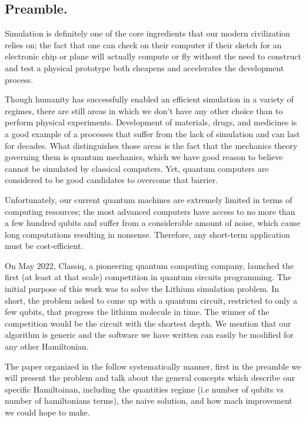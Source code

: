 \documentclass{article}
\begin{document}
\begin{multicols*}{2}

\section{Preamble.}
Simulation is definitely one of the core ingredients that our modern civilization relies on; the fact that one can check on their computer if their sketch for an electronic chip or plane will actually compute or fly without the need to construct and test a physical prototype both cheapens and accelerates the development process. 

Though humanity has successfully enabled an efficient simulation in a variety of regimes, there are still areas in which we don't have any other choice than to perform physical experiments. Development of materials, drugs, and medicines is a good example of a processes that suffer from the lack of simulation and can last for decades. What distinguishes those areas is the fact that the mechanics theory governing them is quantum mechanics, which we have good reason to believe cannot be simulated by classical computers. Yet, quantum computers are considered to be good candidates to overcome that barrier. 

Unfortunately, our current quantum machines are extremely limited in terms of computing resources; the most advanced computers have access to no more than a few hundred qubits and suffer from a considerable amount of noise, which cause long computations resulting in nonsense. Therefore, any short-term application must be cost-efficient.

On May 2022, Classiq, a pioneering quantum computing company, launched the first (at least at that scale) competition in quantum circuits programming. The initial purpose of this work was to solve the Lithium simulation problem. In short, the problem asked to come up with a quantum circuit, restricted to only a few qubits, that progress the lithium molecule in time. The winner of the competition would be the circuit with the shortest depth. We mention that our algorithm is generic and the software we have written can easily be modified for any other Hamiltonian.

The paper organized in the follow systematically manner, first in the preamble we will present the problem and talk about the general concepts which describe our specific Hamiltoinan, including the quantities regime (i.e number of qubits vs number of hamiltonians terms), the naive solution, and how mach improvement we could hope to make.     



\end{multicols*}
\end{document}
